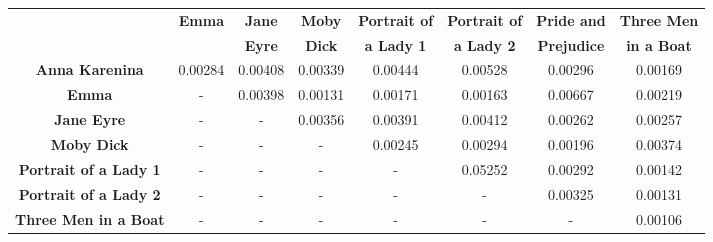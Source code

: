 \documentclass[a4paper,11pt,oneside]{book}
\begin{document}
\begin{enumerate}
		\begin{sideways}
		\begin{tabular} {cccccccc}
 			\toprule
   		 & \multirow{2}{*}{\textbf{Emma}} & \textbf{Jane} &  \textbf{Moby} & \textbf{Portrait of} & \textbf{Portrait of} & \textbf{Pride and}  &  \textbf{Three Men} \\ 
   			& & \textbf{Eyre} & \textbf{Dick} & \textbf{a Lady 1} & \textbf{a Lady 2} & \textbf{Prejudice} & \textbf{in a Boat} \\
	   \hline
		 \textbf{Anna Karenina}  & 0.00284 &  0.00408 &  0.00339 & 0.00444 &  0.00528 & 0.00296 &  0.00169  \\ 
		 \textbf{Emma}  & - & 0.00398 & 0.00131 & 0.00171& 0.00163 & 0.00667 &  0.00219\\ 
		 \textbf{Jane Eyre}  & - & - & 0.00356 &  0.00391 & 0.00412 & 0.00262 & 0.00257\\ 
			\textbf{Moby Dick}  & - & - & - & 0.00245 &  0.00294 & 0.00196 & 0.00374\\ 
			\textbf{Portrait of a Lady 1}  & - & - & - & - & 0.05252 & 0.00292 & 0.00142 \\
			\textbf{Portrait of a Lady 2}  & - & - & - & - & - & 0.00325 & 0.00131 \\ 
			\textbf{Three Men in a Boat}  & - & - & - & - & - & - & 0.00106 \\ 
    \bottomrule
\end{tabular}
	\end{sideways}


\end{enumerate}
\end{document}
